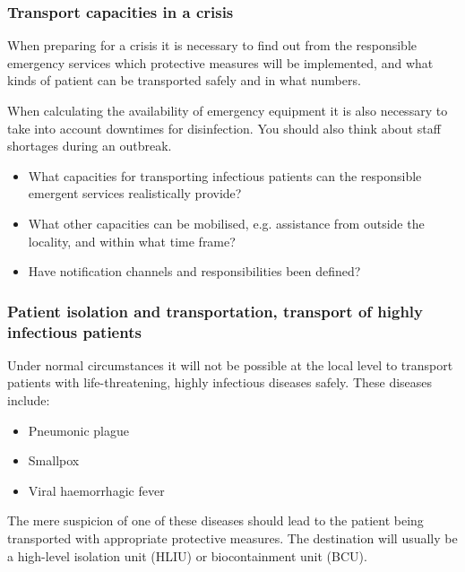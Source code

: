 \documentclass{article}
\begin{document}
\subsubsection{Transport capacities in a crisis}\label{H5507615}



When preparing for a crisis it is necessary to find out from the responsible emergency services which protective measures will be implemented, and what kinds of patient can be transported safely and in what numbers.


When calculating the availability of emergency equipment it is also necessary to take into account downtimes for disinfection. You should also think about staff shortages during an outbreak.

\begin{itemize}
\item What capacities for transporting infectious patients can the responsible emergent services realistically provide?


\item What other capacities can be mobilised, e.g. assistance from outside the locality, and within what time frame?


\item Have notification channels and responsibilities been defined?


\end{itemize}

\subsubsection{Patient isolation and transportation, transport of highly infectious patients}\label{H9893126}



Under normal circumstances it will not be possible at the local level to transport patients with life-threatening, highly infectious diseases safely. These diseases include:

\begin{itemize}
\item Pneumonic plague


\item Smallpox


\item Viral haemorrhagic fever


\end{itemize}

The mere suspicion of one of these diseases should lead to the patient being transported with appropriate protective measures. The destination will usually be a high-level isolation unit (HLIU) or biocontainment unit (BCU).
\end{document}
